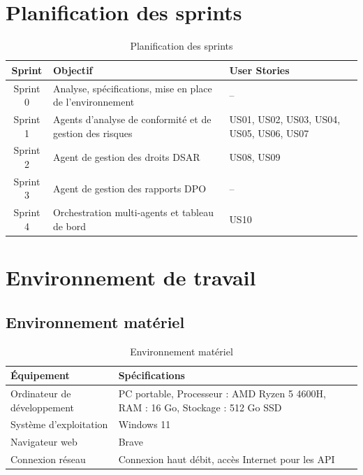 \documentclass[12pt,a4paper]{report}
\begin{document}
\section{Planification des sprints}

\begin{table}[H]
\centering
\caption{Planification des sprints}
\label{tab:planification_sprints}
\begin{tabularx}{\textwidth}{|c|X|X|}
\hline
\textbf{Sprint} & \textbf{Objectif} & \textbf{User Stories} \\
\hline
Sprint 0 & Analyse, spécifications, mise en place de l'environnement & -- \\
\hline
Sprint 1 & Agents d'analyse de conformité et de gestion des risques & US01, US02, US03, US04, US05, US06, US07 \\
\hline
Sprint 2 & Agent de gestion des droits DSAR & US08, US09 \\
\hline
Sprint 3 & Agent de gestion des rapports DPO & -- \\
\hline
Sprint 4 & Orchestration multi-agents et tableau de bord & US10 \\
\hline
\end{tabularx}
\end{table}

\section{Environnement de travail}

\subsection{Environnement matériel}

\begin{table}[H]
\centering
\caption{Environnement matériel}
\label{tab:env_materiel}
\begin{tabularx}{\textwidth}{|l|X|}
\hline
\textbf{Équipement} & \textbf{Spécifications} \\
\hline
Ordinateur de développement & PC portable, Processeur : AMD Ryzen 5 4600H, RAM : 16 Go, Stockage : 512 Go SSD \\
\hline
Système d'exploitation & Windows 11 \\
\hline
Navigateur web & Brave \\
\hline
Connexion réseau & Connexion haut débit, accès Internet pour les API \\
\hline
\end{tabularx}
\end{table}
\end{document}
